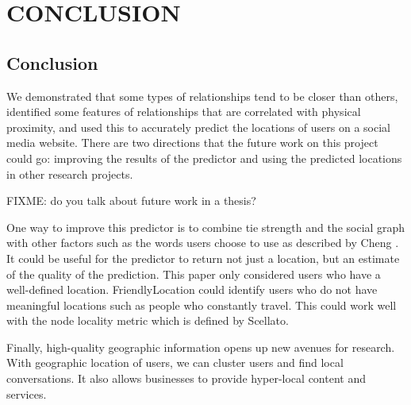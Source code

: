 \ifdefined\THESIS
    \chapter{\uppercase{Conclusion}}
\else
    \section{Conclusion}
\fi
We demonstrated that some types of relationships tend to be closer than others,
identified some features of relationships that are correlated with physical
proximity, and used this to accurately predict the locations of users on a
social media website.
There are two directions that the future work on this project could go:
improving the results of the predictor and using the predicted locations in
other research projects.

FIXME: do you talk about future work in a thesis?

One way to improve this predictor is to combine tie strength and the social
graph with other factors such as the words users choose to use as described by
Cheng \cite{cheng2010you}.
It could be useful for the predictor to return not just a location, but an
estimate of the quality of the prediction.  This paper only considered
users who have a well-defined location. FriendlyLocation could identify users
who do not have meaningful locations such as people who constantly travel.
This could work well with the node locality metric which is defined by
Scellato\cite{scellato2010distance}.

Finally, high-quality geographic information opens up new avenues for research.
With geographic location of users, we can cluster users and find local
conversations.
It also allows businesses to provide hyper-local content and services.


